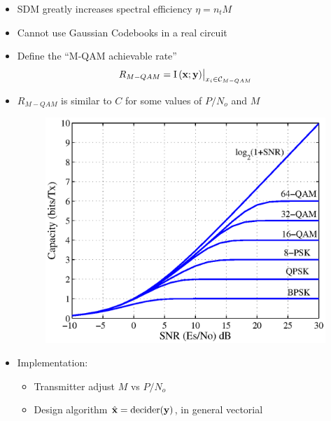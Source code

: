 \documentclass[xcolor=dvipsnames,aspectratio=169]{beamer}
\begin{document}
{\begin{figure}
    \end{figure}
    \begin{itemize}
     \item SDM greatly increases spectral efficiency $\eta=n_tM$
     \item Cannot use Gaussian Codebooks in a real circuit
     \pagebreak
     \item Define the ``M-QAM achievable rate''
        $$R_{M-QAM} =  {\textnormal{I}\left(\mathbf{x};\mathbf{y}\right)}\big|_{x_i\in\mathcal{C}_{M-QAM}}$$
     \item $R_{M-QAM}$ is similar to $C$ for some values of $P/N_o$ and $M$
        \begin{figure}
        \includegraphics[width=.35\columnwidth]{capacityDiCo}
        \end{figure}
     \item Implementation: 
     \begin{itemize}
        \item Transmitter adjust $M$ vs $P/N_o$
        \item Design algorithm $\hat{\mathbf{x}}=\textnormal{decider}(\mathbf{y})$, in general vectorial
    \end{itemize}
    \end{itemize}
}
\end{document}
